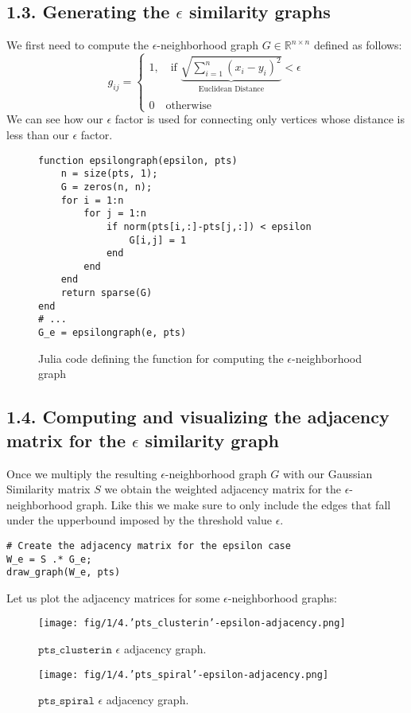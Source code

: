 \documentclass[unicode,11pt,a4paper,oneside,numbers=endperiod,openany]{scrartcl}
\begin{document}
\subsection*{1.3. Generating the $\epsilon$ similarity graphs}
We first need to compute the $\epsilon$-neighborhood graph $G\in \mathbb{R}^{n\times n}$ defined as follows:\\
\begin{equation}
g_{ij} = \begin{cases}
    1, \quad \text{if }
    
    \underbrace{\sqrt{\sum_{i=1}^{n}(x_i - y_i)^2} }_\text{Euclidean Distance} < \epsilon
    \\\\
    0 \quad \text{otherwise}
\end{cases}
\end{equation}
We can see how our $\epsilon$ factor is used for connecting only vertices whose distance is less than our $\epsilon$ factor.
\begin{figure}[h!]
\begin{verbatim}
function epsilongraph(epsilon, pts)
    n = size(pts, 1);
    G = zeros(n, n);
    for i = 1:n
        for j = 1:n
            if norm(pts[i,:]-pts[j,:]) < epsilon
                G[i,j] = 1
            end
        end
    end
    return sparse(G)
end
# ...
G_e = epsilongraph(e, pts)
\end{verbatim}
\caption{Julia code defining the function for computing the $\epsilon$-neighborhood graph}
\end{figure}
\subsection*{1.4. Computing and visualizing the adjacency matrix for the $\epsilon$ similarity graph}

Once we multiply the resulting $\epsilon$-neighborhood graph $G$ with our Gaussian Similarity matrix $S$ we obtain the weighted adjacency matrix for the $\epsilon$-neighborhood graph. Like this we make sure to only include the edges that fall under the upperbound imposed by the threshold value $\epsilon$.
\begin{verbatim}
# Create the adjacency matrix for the epsilon case
W_e = S .* G_e;
draw_graph(W_e, pts)
\end{verbatim}
Let us plot the adjacency matrices for some $\epsilon$-neighborhood graphs:
\begin{figure}[h!]
    \begin{minipage}{0.5\textwidth}
        \centering
        \texttt{[image: fig/1/4.'pts\_clusterin'-epsilon-adjacency.png]}
        \caption{$\texttt {pts\_clusterin }\epsilon$ adjacency graph.}
    \end{minipage}
        \begin{minipage}{0.5\textwidth}
        \centering
        \texttt{[image: fig/1/4.'pts\_spiral'-epsilon-adjacency.png]}
        \caption{$\texttt {pts\_spiral }\epsilon$ adjacency graph.}
    \end{minipage}
\end{figure}
\end{document}
